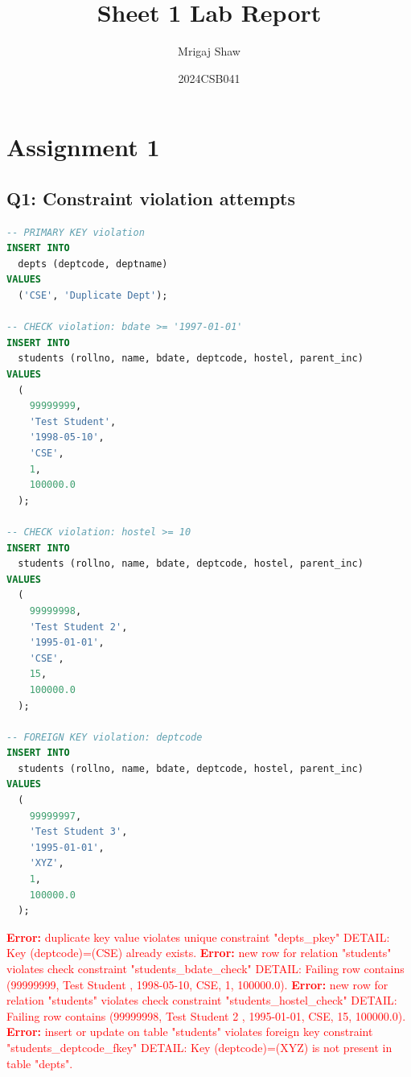 \documentclass[11pt, a4paper]{article}
\title{Sheet 1 Lab Report}
\author{Mrigaj Shaw}
\date{2024CSB041}
\begin{document}
\maketitle

\section{Assignment 1}
\subsection*{Q1: Constraint violation attempts}
\begin{lstlisting}[language=SQL]
-- PRIMARY KEY violation
INSERT INTO
  depts (deptcode, deptname)
VALUES
  ('CSE', 'Duplicate Dept');

-- CHECK violation: bdate >= '1997-01-01'
INSERT INTO
  students (rollno, name, bdate, deptcode, hostel, parent_inc)
VALUES
  (
    99999999,
    'Test Student',
    '1998-05-10',
    'CSE',
    1,
    100000.0
  );

-- CHECK violation: hostel >= 10
INSERT INTO
  students (rollno, name, bdate, deptcode, hostel, parent_inc)
VALUES
  (
    99999998,
    'Test Student 2',
    '1995-01-01',
    'CSE',
    15,
    100000.0
  );

-- FOREIGN KEY violation: deptcode
INSERT INTO
  students (rollno, name, bdate, deptcode, hostel, parent_inc)
VALUES
  (
    99999997,
    'Test Student 3',
    '1995-01-01',
    'XYZ',
    1,
    100000.0
  );
\end{lstlisting}
\vspace{0.3cm}
\textcolor{red}{\textbf{Error:} duplicate key value violates unique constraint "depts\_pkey"
DETAIL:  Key (deptcode)=(CSE) already exists.}\vspace{0.2cm}\newline
\textcolor{red}{\textbf{Error:} new row for relation "students" violates check constraint "students\_bdate\_check"
DETAIL:  Failing row contains (99999999, Test Student                  , 1998-05-10, CSE, 1, 100000.0).}\vspace{0.2cm}\newline
\textcolor{red}{\textbf{Error:} new row for relation "students" violates check constraint "students\_hostel\_check"
DETAIL:  Failing row contains (99999998, Test Student 2                , 1995-01-01, CSE, 15, 100000.0).}\vspace{0.2cm}\newline
\textcolor{red}{\textbf{Error:} insert or update on table "students" violates foreign key constraint "students\_deptcode\_fkey"
DETAIL:  Key (deptcode)=(XYZ) is not present in table "depts".}\vspace{0.2cm}
\newpage
\end{document}
